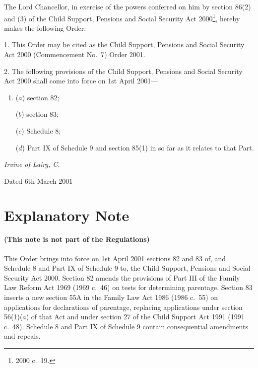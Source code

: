\documentclass[12pt,a4paper]{article}
\title{\regstitle}
\author{S.I.\ 2001 No.\ 774 (C.28)}
\date{Made
6th March 2001\\
}
\begin{document}
\maketitle

\noindent
The Lord Chancellor, in exercise of the powers conferred on him by section 86(2) and (3) of the Child Support, Pensions and Social Security Act 2000\footnote{2000 c.\ 19.}, hereby makes the following Order: 

%
%

\bigskip

\setcounter{secnumdepth}{-2}

1.  This Order may be cited as the Child Support, Pensions and Social Security Act 2000 (Commencement No.\ 7) Order 2001.

\medskip

2.  The following provisions of the Child Support, Pensions and Social Security Act 2000 shall come into force on 1st April 2001—
\begin{enumerate}\item[]
($a$) section 82;

($b$) section 83;

($c$) Schedule 8;

($d$) Part IX of Schedule 9 and section 85(1) in so far as it relates to that Part.
\end{enumerate}

\bigskip


{\raggedleft
\emph{Irvine of Lairg, C.}%

}

Dated
6th March 2001

\small

\part{Explanatory Note}

\renewcommand\parthead{— Explanatory Note}

\subsection*{(This note is not part of the Regulations)}

This Order brings into force on 1st April 2001 sections 82 and 83 of, and Schedule 8 and Part IX of Schedule 9 to, the Child Support, Pensions and Social Security Act 2000. Section 82 amends the provisions of Part III of the Family Law Reform Act 1969 (1969 c.\ 46) on tests for determining parentage. Section 83 inserts a new section 55A in the Family Law Act 1986 (1986 c.\ 55) on applications for declarations of parentage, replacing applications under section 56(1)($a$) of that Act and under section 27 of the Child Support Act 1991 (1991 c.\ 48). Schedule 8 and Part IX of Schedule 9 contain consequential amendments and repeals. 
\end{document}
